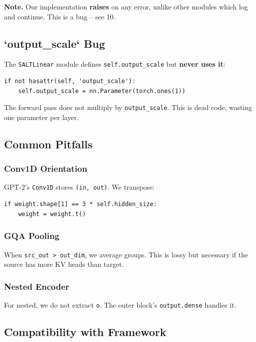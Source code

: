 \textbf{Note.} Our implementation \textbf{raises} on any error, unlike other modules 
which log and continue. This is a bug -- see  10.

\subsection{`output\_scale` Bug}

The \texttt{SALTLinear} module defines \texttt{self.output\_scale} but \textbf{never uses it}:

\begin{lstlisting}
if not hasattr(self, 'output_scale'):
    self.output_scale = nn.Parameter(torch.ones(1))
\end{lstlisting}

The forward pass does not multiply by \texttt{output\_scale}. This is dead code, 
wasting one parameter per layer.

\subsection{Common Pitfalls}

\subsubsection{Conv1D Orientation}

GPT-2's \texttt{Conv1D} stores \texttt{(in, out)}. We transpose:

\begin{lstlisting}
if weight.shape[1] == 3 * self.hidden_size:
    weight = weight.t()
\end{lstlisting}

\subsubsection{GQA Pooling}

When \texttt{src\_out > out\_dim}, we average groups. This is lossy but necessary 
if the source has more KV heads than target.

\subsubsection{Nested Encoder}

For nested, we do not extract \texttt{o}. The outer block's \texttt{output.dense} handles it.

\subsection{Compatibility with Framework}

